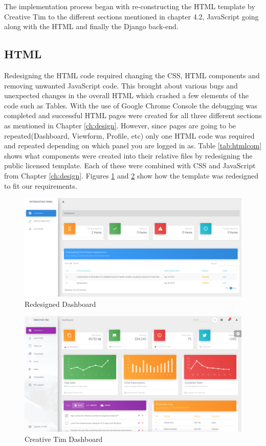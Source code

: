 \documentclass[../main.tex]{subfiles}
\begin{document}
\raggedright
The implementation process began with re-constructing the HTML template by Creative Tim\cite{creativeTimTemplate} to the different sections mentioned in chapter 4.2, JavaScript going along with the HTML and finally the Django back-end.

\subsection{HTML}
Redesigning the HTML code required changing the CSS, HTML components and removing unwanted JavaScript code. This brought about various bugs and unexpected changes in the overall HTML which crashed a few elements of the code such as Tables. With the use of Google Chrome Console the debugging was completed and successful HTML pages were created for all three different sections as mentioned in Chapter \ref{ch:design}. However, since pages are going to be repeated(Dashboard, Viewform, Profile, etc) only one HTML code was required and repeated depending on which panel you are logged in as. Table \ref{tab:htmlcom} shows what components were created into their relative files by redesigning the public licensed template. Each of these were combined with CSS and JavaScript from Chapter \ref{ch:design}. Figures \ref{fig:dash} and \ref{fig:ctdash} show how the template was redesigned to fit our requirements. 

\begin{figure}[H]
        \includegraphics[scale=0.5]
        {images/dash.png}
        \caption{\label{fig:dash} Redesigned Dashboard}
      \end{figure}
      
\begin{figure}[H]
        \includegraphics[scale=0.5]
        {images/ctdash.png}
        \caption{\label{fig:ctdash} Creative Tim Dashboard}
      \end{figure}      
\end{document}
